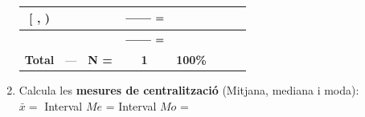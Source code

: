 \documentclass[12pt,a4paper]{article}
\begin{document}
\begin{enumerate}[label=\alph*)]
\begin{center}
\begin{tabular}{|c|c|c|c|c|c|c|c|}
        [ \hspace{1.3cm} , \hspace{1.3cm} ) & & & $\frac{\hspace{0.8cm}}{\hspace{0.8cm}} = $ & & & & \\ \hline
        [ \hspace{1.3cm} , \hspace{1.3cm} ] & & & $\frac{\hspace{0.8cm}}{\hspace{0.8cm}} = $ & & & & \\ \hline
        \textbf{Total} & --- & \textbf{N = } & \textbf{1} & \textbf{100\%} & \multicolumn{3}{c|}{} \\ \hline
    \end{tabular}
    \end{center}
    \vspace{0.5cm}
    \item Calcula les \textbf{mesures de centralització} (Mitjana, mediana i moda): \\[0.3cm]
    $\bar{x} = $ \hspace{3cm} Interval $Me$ = \hspace{3cm} Interval $Mo$ =
\end{enumerate}
\end{document}
